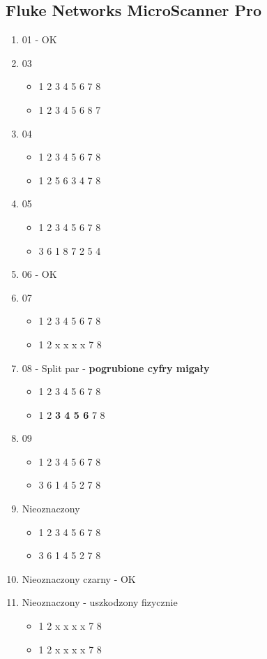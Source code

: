 \documentclass{article}
\begin{document}
\subsection{Fluke Networks MicroScanner Pro}
\begin{enumerate}
\item 01 - OK
\item 03
  \begin{itemize}
  \item 1 2 3 4 5 6 7 8
  \item 1 2 3 4 5 6 8 7
  \end{itemize}
\item 04
  \begin{itemize}
  \item 1 2 3 4 5 6 7 8
  \item 1 2 5 6 3 4 7 8
  \end{itemize}
\item 05
  \begin{itemize}
  \item 1 2 3 4 5 6 7 8
  \item 3 6 1 8 7 2 5 4
  \end{itemize}
\item 06 - OK
\item 07
  \begin{itemize}
  \item 1 2 3 4 5 6 7 8
  \item 1 2 x x x x 7 8
  \end{itemize}
\item 08 - Split par - \textbf{pogrubione cyfry migały}
  \begin{itemize}
  \item 1 2 3 4 5 6 7 8
  \item 1 2 \textbf{3 4 5 6} 7 8 
  \end{itemize}
\item 09
  \begin{itemize}
  \item 1 2 3 4 5 6 7 8
  \item 3 6 1 4 5 2 7 8
  \end{itemize}
\item Nieoznaczony
  \begin{itemize}
  \item 1 2 3 4 5 6 7 8
  \item 3 6 1 4 5 2 7 8
  \end{itemize}
\item Nieoznaczony czarny - OK
\item Nieoznaczony - uszkodzony fizycznie
  \begin{itemize}
  \item 1 2 x x x x 7 8
  \item 1 2 x x x x 7 8
  \end{itemize}
\end{enumerate}
\end{document}
